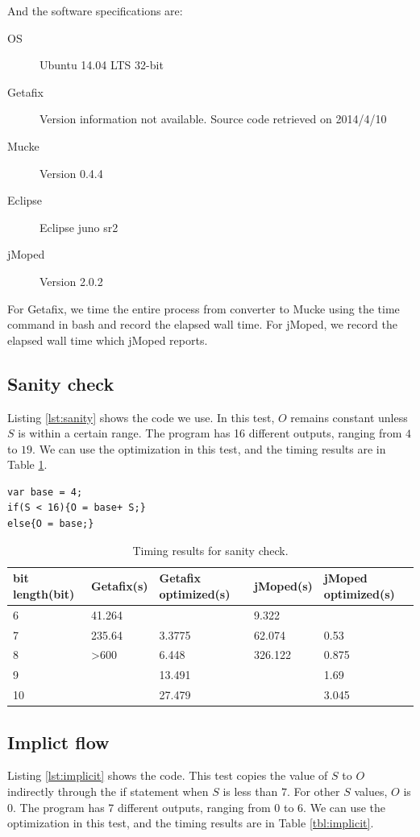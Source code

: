 And the software specifications are:
\begin{description}
  \item[OS] Ubuntu 14.04 LTS 32-bit
  \item[Getafix] Version information not available. Source code retrieved on 2014/4/10
  \item[Mucke] Version 0.4.4
  \item[Eclipse] Eclipse juno sr2
  \item[jMoped] Version 2.0.2
\end{description}

For Getafix, we time the entire process from converter to Mucke using the time command in bash and record the elapsed wall time. For jMoped, we record the elapsed wall time which jMoped reports.

\subsection{Sanity check}
Listing \ref{lst:sanity} shows the code we use. In this test, $O$ remains constant unless $S$ is within a certain range. The program has 16 different outputs, ranging from $4$ to $19$. We can use the optimization in this test, and the timing results are in Table \ref{tbl:sanity}.

\lstset{language=C}  
\begin{lstlisting}[float=h, caption={Sanity check test program.},label=lst:sanity]
var base = 4;
if(S < 16){O = base+ S;}
else{O = base;}
\end{lstlisting}

\begin{table}[htbp]
\begin{tabular}{|l|l|l|l|l|}
\hline
bit length(bit) & Getafix(s) & Getafix optimized(s) & jMoped(s) & jMoped optimized(s) \\ \hline
6 & 41.264 & {} & 9.322 & {} \\ \hline
7 & 235.64 & 3.3775 & {62.074} & 0.53 \\ \hline
8 & \textgreater 600 & 6.448 & {326.122} & 0.875 \\ \hline
9 &  & 13.491 &  & 1.69 \\ \hline
10 &  & 27.479 &  & 3.045 \\ \hline
\end{tabular}
\caption{Timing results for sanity check.}
\label{tbl:sanity}
\end{table}

\subsection{Implict flow}
Listing \ref{lst:implicit} shows the code. This test copies the value of $S$ to $O$ indirectly through the if statement when $S$ is less than $7$. For other $S$ values, $O$ is $0$. The program has 7 different outputs, ranging from $0$ to $6$. We can use the optimization in this test, and the timing results are in Table \ref{tbl:implicit}.

